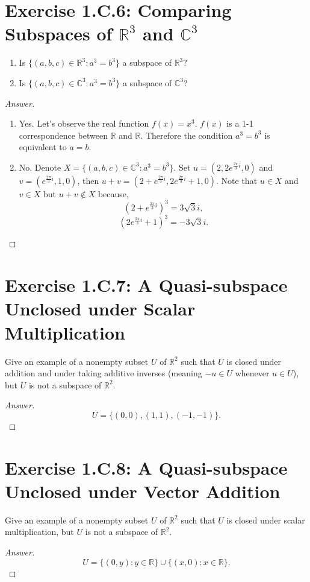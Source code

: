 \section{Exercise 1.C.6: Comparing Subspaces of $\mathbb{R}^3$ and $\mathbb{C}^3$}
\begin{enumerate}[label=(\roman*)]
\item Is $\{(a,b,c)\in\mathbb{R}^3:a^3=b^3\}$ a subspace of $\mathbb{R}^3$?
\item Is $\{(a,b,c)\in\mathbb{C}^3:a^3=b^3\}$ a subspace of $\mathbb{C}^3$?
\end{enumerate}
\begin{proof}[Answer]
\begin{enumerate}[label=(\roman*)]
\item Yes. Let's observe the real function $f(x)=x^3$. $f(x)$ is a 1-1 correspondence between $\mathbb{R}$ and $\mathbb{R}$. Therefore the condition $a^3=b^3$ is equivalent to $a=b$.
\item No. Denote $X=\{(a,b,c)\in\mathbb{C}^3:a^3=b^3\}$. Set $u=(2,2e^{\frac{2\pi}{3}i},0)$ and $v=(e^{\frac{2\pi}{3}i},1,0)$, then $u+v=(2+e^{\frac{2\pi}{3}i},2e^{\frac{2\pi}{3}i}+1,0)$. Note that $u\in X$ and $v\in X$ but $u+v\notin X$ because,
\[
\left(2+e^{\frac{2\pi}{3}i}\right)^3=3\sqrt{3}i,
\]
\[
\left(2e^{\frac{2\pi}{3}i}+1\right)^3=-3\sqrt{3}i.
\]
\end{enumerate}
\end{proof}

\section{Exercise 1.C.7: A Quasi-subspace Unclosed under Scalar Multiplication}
Give an example of a nonempty subset $U$ of $\mathbb{R}^2$ such that $U$ is closed under addition and under taking additive inverses (meaning $-u\in U$ whenever $u\in U$), but $U$ is not a subspace of $\mathbb{R}^2$.
\begin{proof}[Answer]
\[
U=\{(0,0),(1,1),(-1,-1)\}.
\]
\end{proof}

\section{Exercise 1.C.8: A Quasi-subspace Unclosed under Vector Addition}
Give an example of a nonempty subset $U$ of $\mathbb{R}^2$ such that $U$ is closed under scalar multiplication, but $U$ is not a subspace of $\mathbb{R}^2$.
\begin{proof}[Answer]
\[
U=\{(0,y):y\in\mathbb{R}\}\cup\{(x,0):x\in\mathbb{R}\}.
\]
\end{proof}

